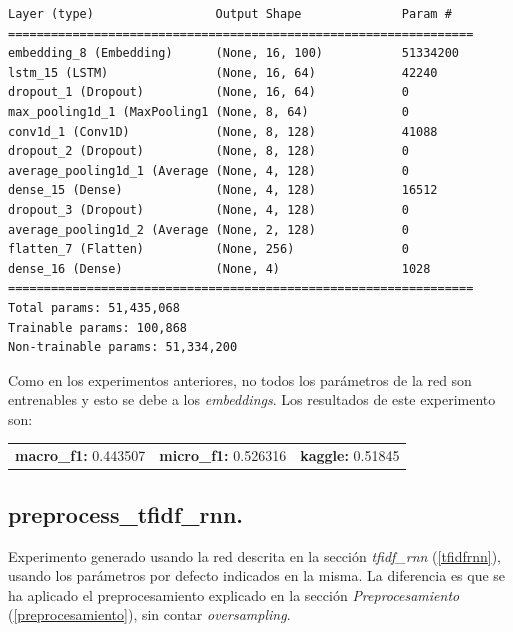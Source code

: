 \documentclass[11pt]{article}
\begin{document}
\begin{verbatim}
Layer (type)                 Output Shape              Param #   
=================================================================
embedding_8 (Embedding)      (None, 16, 100)           51334200  
lstm_15 (LSTM)               (None, 16, 64)            42240     
dropout_1 (Dropout)          (None, 16, 64)            0         
max_pooling1d_1 (MaxPooling1 (None, 8, 64)             0         
conv1d_1 (Conv1D)            (None, 8, 128)            41088     
dropout_2 (Dropout)          (None, 8, 128)            0         
average_pooling1d_1 (Average (None, 4, 128)            0         
dense_15 (Dense)             (None, 4, 128)            16512     
dropout_3 (Dropout)          (None, 4, 128)            0         
average_pooling1d_2 (Average (None, 2, 128)            0         
flatten_7 (Flatten)          (None, 256)               0         
dense_16 (Dense)             (None, 4)                 1028      
=================================================================
Total params: 51,435,068
Trainable params: 100,868
Non-trainable params: 51,334,200
\end{verbatim}

Como en los experimentos anteriores, no todos los parámetros de la red son entrenables y esto se debe a los \textit{embeddings}. Los resultados de este experimento son: 

\begin{table}[H]
\begin{tabular}{c|c|c}
\textbf{macro\_f1:} 0.443507 & \textbf{micro\_f1:} 0.526316 & \textbf{kaggle:} 0.51845
\end{tabular}
\end{table}

\subsection{preprocess\_tfidf\_rnn.} \label{exp_preprocesstfidfrnn}

Experimento generado usando la red descrita en la sección \textit{tfidf\_rnn} (\ref{tfidfrnn}), usando los parámetros por defecto indicados en la misma. La diferencia es que se ha aplicado el preprocesamiento explicado en la sección \textit{Preprocesamiento} (\ref{preprocesamiento}), sin contar \textit{oversampling}.
\end{document}
